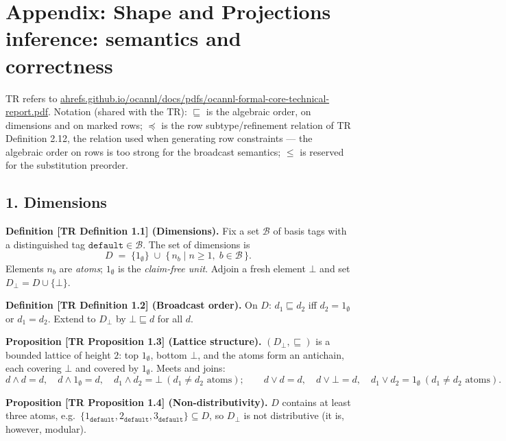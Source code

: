 \documentclass[
  10pt,
  letterpaper,
]{article}
\begin{document}
\section{Appendix: Shape and Projections inference: semantics and
correctness}\label{appendix-shape-and-projections-inference-semantics-and-correctness}

TR refers to
\href{https://ahrefs.github.io/ocannl/docs/pdfs/ocannl-formal-core-technical-report.pdf}{ahrefs.github.io/ocannl/docs/pdfs/ocannl-formal-core-technical-report.pdf}.
Notation (shared with the TR): \(\sqsubseteq\) is the algebraic order,
on dimensions and on marked rows; \(\preceq\) is the row
subtype/refinement relation of TR Definition 2.12, the relation used
when generating row constraints --- the algebraic order on rows is too
strong for the broadcast semantics; \(\le\) is reserved for the
substitution preorder.

\subsection{1. Dimensions}\label{dimensions}

\textbf{Definition {[}TR Definition 1.1{]} (Dimensions).} Fix a set
\(\mathcal{B}\) of basis tags with a distinguished tag
\(\texttt{default} \in \mathcal{B}\). The set of dimensions is
\[D \;=\; \{1_\emptyset\} \;\cup\; \{\, n_b \mid n \ge 1,\; b \in \mathcal{B} \,\}.\]
Elements \(n_b\) are \emph{atoms}; \(1_\emptyset\) is the
\emph{claim-free unit}. Adjoin a fresh element \(\bot\) and set
\(D_\bot = D \cup \{\bot\}\).

\textbf{Definition {[}TR Definition 1.2{]} (Broadcast order).} On \(D\):
\(d_1 \sqsubseteq d_2\) iff \(d_2 = 1_\emptyset\) or \(d_1 = d_2\).
Extend to \(D_\bot\) by \(\bot \sqsubseteq d\) for all \(d\).

\textbf{Proposition {[}TR Proposition 1.3{]} (Lattice structure).}
\((D_\bot, \sqsubseteq)\) is a bounded lattice of height \(2\): top
\(1_\emptyset\), bottom \(\bot\), and the atoms form an antichain, each
covering \(\bot\) and covered by \(1_\emptyset\). Meets and joins:
\[d \wedge d = d,\quad d \wedge 1_\emptyset = d,\quad d_1 \wedge d_2 = \bot \ (d_1 \ne d_2 \text{ atoms});\qquad d \vee d = d,\quad d \vee \bot = d,\quad d_1 \vee d_2 = 1_\emptyset \ (d_1 \ne d_2 \text{ atoms}).\]

\textbf{Proposition {[}TR Proposition 1.4{]} (Non-distributivity).}
\(D\) contains at least three atoms,
e.g.~\(\{1_{\texttt{default}}, 2_{\texttt{default}}, 3_{\texttt{default}}\} \subseteq D\),
so \(D_\bot\) is not distributive (it is, however, modular).
\end{document}
